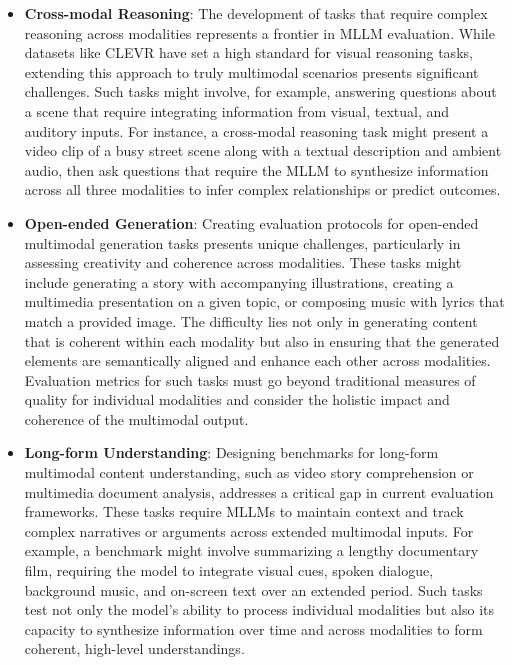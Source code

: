 \begin{itemize}
    \item \textbf{Cross-modal Reasoning}: The development of tasks that require complex reasoning across modalities represents a frontier in MLLM evaluation. While datasets like CLEVR \citep{johnson2017clevr} have set a high standard for visual reasoning tasks, extending this approach to truly multimodal scenarios presents significant challenges. Such tasks might involve, for example, answering questions about a scene that require integrating information from visual, textual, and auditory inputs. For instance, a cross-modal reasoning task might present a video clip of a busy street scene along with a textual description and ambient audio, then ask questions that require the MLLM to synthesize information across all three modalities to infer complex relationships or predict outcomes.

    \item \textbf{Open-ended Generation}: Creating evaluation protocols for open-ended multimodal generation tasks presents unique challenges, particularly in assessing creativity and coherence across modalities. These tasks might include generating a story with accompanying illustrations, creating a multimedia presentation on a given topic, or composing music with lyrics that match a provided image. The difficulty lies not only in generating content that is coherent within each modality but also in ensuring that the generated elements are semantically aligned and enhance each other across modalities. Evaluation metrics for such tasks must go beyond traditional measures of quality for individual modalities and consider the holistic impact and coherence of the multimodal output.

    \item \textbf{Long-form Understanding}: Designing benchmarks for long-form multimodal content understanding, such as video story comprehension or multimedia document analysis, addresses a critical gap in current evaluation frameworks. These tasks require MLLMs to maintain context and track complex narratives or arguments across extended multimodal inputs. For example, a benchmark might involve summarizing a lengthy documentary film, requiring the model to integrate visual cues, spoken dialogue, background music, and on-screen text over an extended period. Such tasks test not only the model's ability to process individual modalities but also its capacity to synthesize information over time and across modalities to form coherent, high-level understandings.
\end{itemize}


